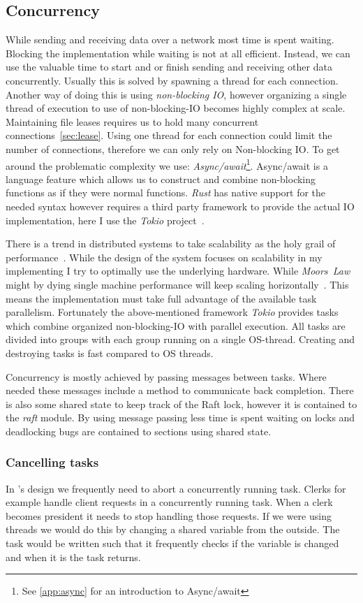 \subsection{Concurrency}
While sending and receiving data over a network most time is spent waiting. Blocking the implementation while waiting is not at all efficient. Instead, we can use the valuable time to start and or finish sending and receiving other data concurrently. Usually this is solved by spawning a thread for each connection. Another way of doing this is using \textit{non-blocking IO}, however organizing a single thread of execution to use of non-blocking-IO becomes highly complex at scale. 
Maintaining file leases requires us to hold many concurrent connections~\cref{sec:lease}. Using one thread for each connection could limit the number of connections, therefore we can only rely on Non-blocking IO. To get around the problematic complexity we use: \textit{Async/await}\footnote{See \cref{app:async} for an introduction to Async/await}. Async/await is a language feature which allows us to construct and combine non-blocking functions as if they were normal functions. \textit{Rust} has native support for the needed syntax however requires a third party framework to provide the actual IO implementation, here I use the \textit{Tokio} project~\cite{tokio}.

There is a trend in distributed systems to take scalability as the holy grail of performance~\cite{scaling}. While the design of the system focuses on scalability in my implementing I try to optimally use the underlying hardware. While \textit{Moors~Law} might by dying single machine performance will keep scaling horizontally~\cite{moore}. This means the implementation must take full advantage of the available task parallelism. Fortunately the above-mentioned framework \textit{Tokio} provides tasks which combine organized non-blocking-IO with parallel execution. All tasks are divided into groups with each group running on a single OS-thread. Creating and destroying tasks is fast compared to OS threads.

Concurrency is mostly achieved by passing messages between tasks. Where needed these messages include a method to communicate back completion. There is also some shared state to keep track of the Raft lock, however it is contained to the \textsl{raft} module. By using message passing less time is spent waiting on locks and deadlocking bugs are contained to sections using shared state. 

\subsubsection*{Cancelling tasks}
In \name's design we frequently need to abort a concurrently running task. Clerks for example handle client requests in a concurrently running task. When a clerk becomes president it needs to stop handling those requests. If we were using threads we would do this by changing a shared variable from the outside. The task would be written such that it frequently checks if the variable is changed and when it is the task returns. 

